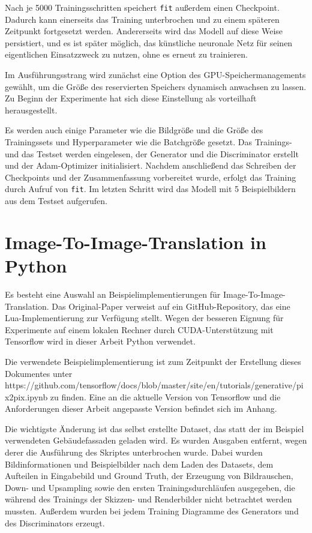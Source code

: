Nach je 5000 Trainingsschritten speichert \lstinline|fit| außerdem einen Checkpoint. Dadurch kann einerseits das Training unterbrochen und zu einem späteren Zeitpunkt fortgesetzt werden. Andererseits wird das Modell auf diese Weise persistiert, und es ist später möglich, das künstliche neuronale Netz für seinen eigentlichen Einsatzzweck zu nutzen, ohne es erneut zu trainieren.

Im Ausführungsstrang wird zunächst eine Option des GPU-Speichermanagements gewählt, um die Größe des reservierten Speichers dynamisch anwachsen zu lassen. \cite{zaccone2018tensorflow} Zu Beginn der Experimente hat sich diese Einstellung als vorteilhaft herausgestellt.

Es werden auch einige Parameter wie die Bildgröße und die Größe des Trainingssets und Hyperparameter wie die Batchgröße gesetzt. Das Trainings- und das Testset werden eingelesen, der Generator und die Discriminator erstellt und der Adam-Optimizer initialisiert. Nachdem anschließend das Schreiben der Checkpoints und der Zusammenfassung vorbereitet wurde, erfolgt das Training durch Aufruf von \lstinline|fit|. Im letzten Schritt wird das Modell mit 5 Beispielbildern aus dem Testset aufgerufen.

\section{Image-To-Image-Translation in Python}
Es besteht eine Auswahl an Beispielimplementierungen für Image-To-Image-Translation. Das Original-Paper verweist auf ein GitHub-Repository, das eine Lua-Implementierung zur Verfügung stellt. Wegen der besseren Eignung für Experimente auf einem lokalen Rechner durch CUDA-Unterstützung mit Tensorflow wird in dieser Arbeit Python verwendet.

Die verwendete Beispielimplementierung ist zum Zeitpunkt der Erstellung dieses Dokumentes unter https://github.com/tensorflow/docs/blob/master/site/en/tutorials/generative/pix2pix.ipynb zu finden. Eine an die aktuelle Version von Tensorflow und die Anforderungen dieser Arbeit angepasste Version befindet sich im Anhang.

Die wichtigste Änderung ist das selbst erstellte Dataset, das statt der im Beispiel verwendeten Gebäudefassaden geladen wird. Es wurden Ausgaben entfernt, wegen derer die Ausführung des Skriptes unterbrochen wurde. Dabei wurden Bildinformationen und Beispielbilder nach dem Laden des Datasets, dem Aufteilen in Eingabebild und Ground Truth, der Erzeugung von Bildrauschen, Down- und Upsampling sowie den ersten Trainingsdurchläufen ausgegeben, die während des Trainings der Skizzen- und Renderbilder nicht betrachtet werden mussten. Außerdem wurden bei jedem Training Diagramme des Generators und des Discriminators erzeugt.

